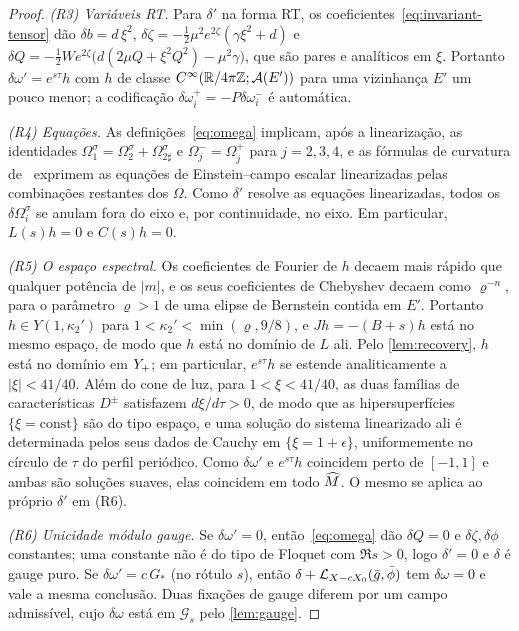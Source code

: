 \begin{proof}
\emph{(R3) Variáveis RT.} Para $\delta'$ na forma RT, os coeficientes~\eqref{eq:invariant-tensor} dão
$\delta b=d\,\xi^2$, $\delta\zeta=-\tfrac12\mu^2e^{2\zeta}(\gamma\xi^2+d)$ e
$\delta Q=-\tfrac12We^{2\zeta}\big(d(2\mu Q+\xi^2Q^2)-\mu^2\gamma\big)$, que são pares e analíticos em $\xi$.
Portanto $\delta\omega'=e^{s\tau}h$ com $h$ de classe $C^\infty(\mathbb{R}/4\pi\mathbb{Z};\mathcal A(E'))$ para uma vizinhança
$E'$ um pouco menor; a codificação $\delta\omega_i^+=-P\delta\omega_i^-$ é automática.

\emph{(R4) Equações.} As definições~\eqref{eq:omega} implicam, após a linearização, as identidades
$\Omega_1^\sigma=\Omega_2^\sigma+\Omega_{2\sharp}^\sigma$ e $\Omega_j^-=\Omega_j^+$ para $j=2,3,4$, e as
fórmulas de curvatura de~\cite[\S2]{RT2019} exprimem as equações de Einstein--campo escalar linearizadas pelas
combinações restantes dos $\Omega$. Como $\delta'$ resolve as equações linearizadas, todos os $\delta\Omega_i^\sigma$
se anulam fora do eixo e, por continuidade, no eixo. Em particular, $L(s)h=0$ e $C(s)h=0$.

\emph{(R5) O espaço espectral.} Os coeficientes de Fourier de $h$ decaem mais rápido que qualquer potência de $|m|$, e
os seus coeficientes de Chebyshev decaem como $\varrho^{-n}$, para o parâmetro $\varrho>1$ de uma elipse de Bernstein
contida em $E'$. Portanto $h\in Y(1,\kappa_2')$ para $1<\kappa_2'<\min(\varrho,9/8)$, e $Jh=-(B+s)h$ está no mesmo
espaço, de modo que $h$ está no domínio de $L$ ali. Pelo \cref{lem:recovery}, $h$ está no domínio em $Y_{+}$; em particular, $e^{s\tau}h$ se estende analiticamente a
$|\xi|<41/40$. Além do cone de luz, para $1<\xi<41/40$, as duas famílias de características $D^\pm$ satisfazem
$d\xi/d\tau>0$, de modo que as hipersuperfícies $\{\xi=\mathrm{const}\}$ são do tipo espaço, e uma solução do sistema
linearizado ali é determinada pelos seus dados de Cauchy em $\{\xi=1+\epsilon\}$, uniformemente no círculo de $\tau$ do
perfil periódico. Como $\delta\omega'$ e $e^{s\tau}h$ coincidem perto de $[-1,1]$ e ambas são soluções suaves, elas
coincidem em todo $\widehat M$. O mesmo se aplica ao próprio $\delta'$ em (R6).

\emph{(R6) Unicidade módulo gauge.} Se $\delta\omega'=0$, então~\eqref{eq:omega} dão $\delta Q=0$ e
$\delta\zeta,\delta\phi$ constantes; uma constante não é do tipo de Floquet com $\Re s>0$, logo $\delta'=0$ e $\delta$
é gauge puro. Se $\delta\omega'=c\,G_*$ (no rótulo $s$), então $\delta+\mathcal{L}_{X-cX_0}(\bar g,\bar\phi)$ tem
$\delta\omega=0$ e vale a mesma conclusão. Duas fixações de gauge diferem por um campo admissível, cujo
$\delta\omega$ está em $\mathcal G_s$ pelo \cref{lem:gauge}.


\end{proof}
